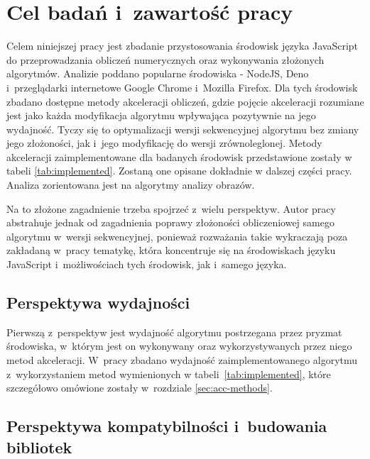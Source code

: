 
\section{Cel badań i~zawartość pracy}


 
Celem niniejszej pracy jest zbadanie przystosowania środowisk języka JavaScript do przeprowadzania obliczeń numerycznych oraz wykonywania złożonych algorytmów. Analizie poddano popularne środowiska - NodeJS, Deno i~przeglądarki internetowe Google Chrome i~Mozilla Firefox. Dla tych środowisk zbadano dostępne metody akceleracji obliczeń, gdzie pojęcie akceleracji rozumiane jest jako każda modyfikacja algorytmu wpływająca pozytywnie na jego wydajność. Tyczy się to optymalizacji wersji sekwencyjnej algorytmu bez zmiany jego złożoności, jak i~jego modyfikację do wersji zrównoleglonej. Metody akceleracji zaimplementowane dla badanych środowisk przedstawione zostały w tabeli \ref{tab:implemented}. Zostaną one opisane dokładnie w dalszej części pracy. Analiza zorientowana jest na algorytmy analizy obrazów.


Na to złożone zagadnienie trzeba spojrzeć z~wielu perspektyw. Autor pracy abstrahuje jednak od zagadnienia poprawy złożoności obliczeniowej samego algorytmu w~wersji sekwencyjnej, ponieważ rozważania takie wykraczają poza zakładaną w~pracy tematykę, która koncentruje się na środowiskach języku JavaScript i~możliwościach tych środowisk, jak i~samego języka.

\subsection{Perspektywa wydajności}

Pierwszą z~perspektyw jest wydajność algorytmu postrzegana przez pryzmat środowiska, w~którym jest on wykonywany oraz wykorzystywanych przez niego metod akceleracji. W~pracy zbadano wydajność zaimplementowanego algorytmu z~wykorzystaniem metod wymienionych w tabeli~\ref{tab:implemented}, które szczegółowo omówione zostały w~rozdziale \ref{sec:acc-methods}.

\subsection{Perspektywa kompatybilności i~budowania bibliotek}

